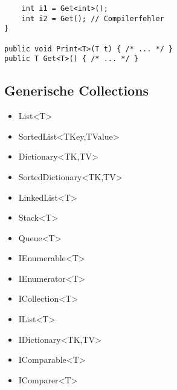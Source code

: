 \begin{multicols*}{2}
\begin{lstlisting}
    int i1 = Get<int>();
    int i2 = Get(); // Compilerfehler
}

public void Print<T>(T t) { /* ... */ }
public T Get<T>() { /* ... */ }
\end{lstlisting}

\subsection{Generische Collections}
\begin{multicols*}{2}
\begin{itemize}
    \item List<T>
    \item SortedList<TKey,TValue>
    \item Dictionary<TK,TV>
    \item SortedDictionary<TK,TV>
    \item LinkedList<T>
    \item Stack<T>
    \item Queue<T>
\end{itemize}
\columnbreak
{}
\begin{itemize}
    \item IEnumerable<T>
    \item IEnumerator<T>
    \item ICollection<T>
    \item IList<T>
    \item IDictionary<TK,TV>
    \item IComparable<T>
    \item IComparer<T>
\end{itemize}
\end{multicols*}
\end{multicols*}